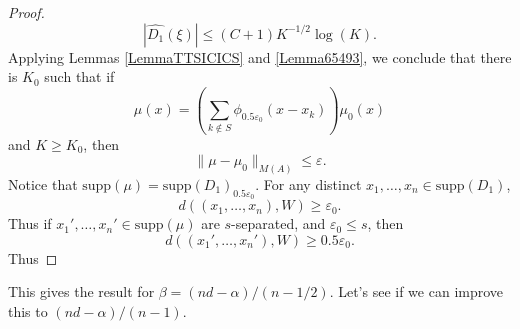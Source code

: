 \documentclass[12pt,reqno]{article}
\numberwithin{equation}{section}
\begin{document}
\begin{proof}
    \[ |\widehat{D_1}(\xi)| \leq (C+1) K^{-1/2} \log(K). \]
    Applying Lemmas \ref{LemmaTTSICICS} and \ref{Lemma65493}, we conclude that there is $K_0$ such that if
    \[ \mu(x) = \left( \sum_{k \not \in S} \phi_{0.5 \varepsilon_0}(x - x_k) \right) \mu_0(x) \]
    and $K \geq K_0$, then
    \[ \| \mu - \mu_0 \|_{M(A)} \leq \varepsilon. \]
    Notice that $\text{supp}(\mu) = \text{supp}(D_1)_{0.5 \varepsilon_0}$. For any distinct $x_1, \dots, x_n \in \text{supp}(D_1)$,
    \[ d((x_1, \dots, x_n), W) \geq \varepsilon_0. \]
    Thus if $x_1', \dots, x_n' \in \text{supp}(\mu)$ are $s$-separated, and $\varepsilon_0 \leq s$, then
    \[ d((x_1', \dots, x_n'),W) \geq 0.5 \varepsilon_0. \]
    Thus
\end{proof}

This gives the result for $\beta = (nd-\alpha)/(n-1/2)$. Let's see if we can improve this to $(nd-\alpha)/(n-1)$.
\end{document}

